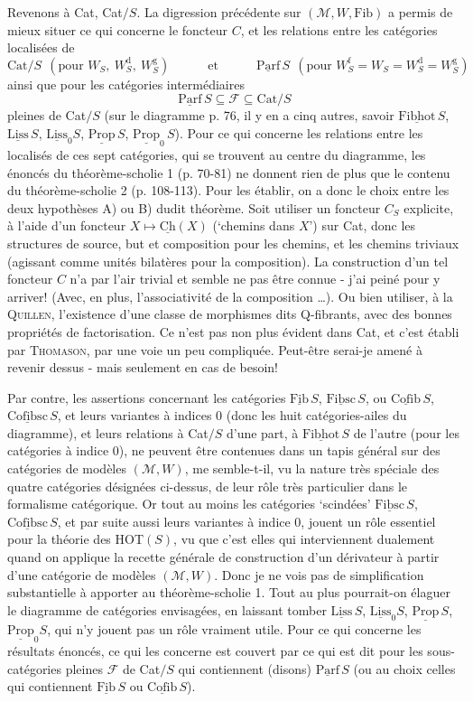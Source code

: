 \documentclass[11pt]{article}
\newcommand{\printedpage}[1]{\marginpar{\footnotesize p.~#1}}
\newcommand{\msp}[1]{\marginpar{\footnotesize [#1]}}
\newcommand{\Cat}{\mathrm{Cat}}
\newcommand{\Fib}{\underline{\mathrm{Fib}}\,}
\newcommand{\Fibhot}{\underline{\mathrm{Fibhot}}\,}
\newcommand{\Fibsc}{\underline{\mathrm{Fibsc}}\,}
\newcommand{\Cofib}{\underline{\mathrm{Cofib}}\,}
\newcommand{\Cofibsc}{\underline{\mathrm{Cofibsc}}\,}
\newcommand{\Parf}{\underline{\mathrm{Parf}}\,}
\newcommand{\Liss}{\underline{\mathrm{Liss}}}
\newcommand{\Prop}{\underline{\mathrm{Prop}}}
\newcommand{\M}{\mathcal{M}}
\begin{document}
Revenons à Cat, Cat$/S$. La digression précédente sur $(\M, W, \mathrm{Fib})$ a permis de mieux situer ce qui concerne le foncteur $C$, et les relations entre les catégories localisées de
\[\Cat/S \ \ (\text{pour } W_S,\ W_S^{\mathrm{d}},\ W_S^{\mathrm{g}}) \qquad\quad \text{et} \qquad\quad \Parf S \ \ (\text{pour } W_S^{\mathrm{f}} = W_S = W_S^{\mathrm{d}} = W_S^{\mathrm{g}})\]
ainsi que pour les catégories intermédiaires
\[\Parf S \subseteq \mathcal{F} \subseteq \Cat/S\]
pleines de Cat$/S$ (sur le diagramme p. 76, il y en a cinq autres, savoir $\Fibhot S$, $\Liss\,S$, $\Liss_0 S$, $\Prop\,S$, $\Prop_0\,S$). Pour ce qui concerne les relations entre les localisés de ces sept catégories, qui se trouvent au centre du diagramme, les énoncés du théorème-scholie 1 (p. 70-81) ne donnent rien de plus que le contenu du théorème-scholie 2 (p. 108-113). Pour les établir, on a donc le choix entre les deux hypothèses A) ou B) dudit théorème. Soit utiliser un foncteur $C_S$ explicite, à l'aide d'un
\msp{page 114}
foncteur $X \longmapsto \underline{\mathrm{Ch}}(X)$ (‘chemins dans $X$’) sur Cat, donc les structures de source, but et composition pour les chemins, et les chemins triviaux (agissant comme unités bilatères pour la composition). La construction d'un tel foncteur $C$ n'a par l'air trivial et semble ne pas être connue - j'ai peiné pour y arriver! (Avec, en plus, l'associativité de la composition \ldots). Ou bien utiliser, à la \textsc{Quillen}, l'existence d'une classe de morphismes dits Q-fibrants, avec des bonnes propriétés de factorisation. Ce n'est pas non plus évident dans Cat, et c'est établi par \textsc{Thomason}, par une voie un peu compliquée. Peut-être serai-je amené à revenir dessus - mais seulement en cas de besoin! %

Par contre, les assertions concernant les catégories $\Fib S$, $\Fibsc S$, ou $\Cofib S$, $\Cofibsc S$, et leurs variantes à indices 0 (donc les huit catégories-ailes du diagramme), et leurs relations à Cat$/S$ d'une part, à $\Fibhot S$ de l'autre (pour les catégories à indice 0), ne peuvent être contenues dans un tapis général sur des catégories de modèles $(\M, W)$, me semble-t-il, vu la nature très spéciale des quatre catégories désignées ci-dessus, de leur rôle très particulier dans le formalisme catégorique. Or tout au moins les catégories ‘scindées’ $\Fibsc S$, $\Cofibsc S$, et par suite aussi leurs variantes à indice 0, jouent un rôle essentiel pour la théorie des HOT$(S)$, vu que c'est elles qui
\msp{page 115}
interviennent dualement quand on applique la recette générale de construction d'un dérivateur à partir d'une catégorie de modèles $(\M, W)$. Donc je ne vois pas de simplification
\printedpage{72}
substantielle à apporter au théorème-scholie 1. Tout au plus pourrait-on élaguer le diagramme de catégories envisagées, en laissant tomber $\Liss\,S$, $\Liss_0 S$, $\Prop\,S$, $\Prop_0 S$, qui n'y jouent pas un rôle vraiment utile. Pour ce qui concerne les résultats énoncés, ce qui les concerne est couvert par ce qui est dit pour les sous-catégories pleines $\mathcal{F}$ de Cat$/S$ qui contiennent (disons) $\Parf S$ (ou au choix celles qui contiennent $\Fib S$ ou $\Cofib S$).
\end{document}
